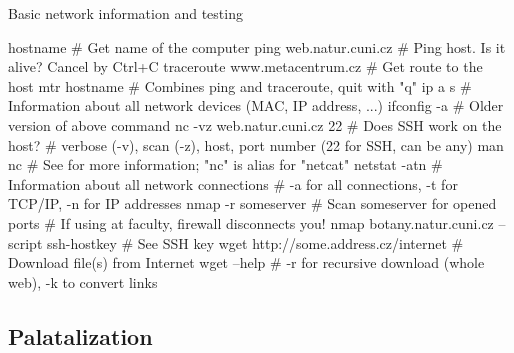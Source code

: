 \documentclass[compress, ucs, xelatex, 11pt, xcolor=svgnames,
  hyperref={
    bookmarks=true,
    unicode=true,
    colorlinks=true,
    pdftitle={Linux, command line and MetaCentrum},
    plainpages=false,
    pdfauthor={Vojtech Zeisek},
    pdfsubject={Course about use of Linux command line, writing shell scripts and using MetaCentrum of CESNET},
    pdfcreator={XeLaTeX},
    pdfkeywords={Linux, GNU, BASH, shell, command line, MetaCentrum},
    linkcolor=Red,
    anchorcolor=Blue,
    citecolor=Purple,
    filecolor=DodgerBlue,
    menucolor=DarkOrchid,
    urlcolor=DeepSkyBlue,
    pdftex},
  url={hyphens, lowtilde} %
  ]{beamer}
\begin{document}
\begin{frame}[fragile]{Basic network information and testing}
  \begin{bashcode}
    hostname # Get name of the computer
    ping web.natur.cuni.cz # Ping host. Is it alive? Cancel by Ctrl+C
    traceroute www.metacentrum.cz # Get route to the host
    mtr hostname # Combines ping and traceroute, quit with "q"
    ip a s # Information about all network devices (MAC, IP address, ...)
    ifconfig -a # Older version of above command
    nc -vz web.natur.cuni.cz 22 # Does SSH work on the host?
       # verbose (-v), scan (-z), host, port number (22 for SSH, can be any)
    man nc # See for more information; "nc" is alias for "netcat"
    netstat -atn # Information about all network connections
            # -a for all connections, -t for TCP/IP, -n for IP addresses
    nmap -r someserver # Scan someserver for opened ports
                       # If using at faculty, firewall disconnects you!
    nmap botany.natur.cuni.cz --script ssh-hostkey # See SSH key
    wget http://some.address.cz/internet # Download file(s) from Internet
    wget --help # -r for recursive download (whole web), -k to convert links
  \end{bashcode}
\end{frame}

\subsection{Palatalization}
\end{document}
